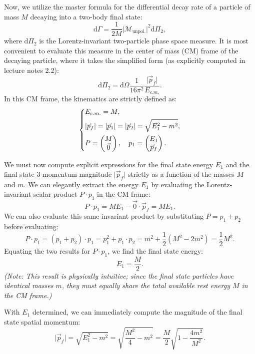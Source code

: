 Now, we utilize the master formula for the differential decay rate of a particle of mass \(M\) decaying into a two-body final state:
\[
    \mathrm{d} \Gamma = \frac{1}{2M} \vert \mathcal{M}_{\text{unpol.}} \vert^2 \mathrm{d} \Pi_2,
\]
where \( \mathrm{d} \Pi_2 \) is the Lorentz-invariant two-particle phase space measure. It is most convenient to evaluate this measure in the center of mass (CM) frame of the decaying particle, where it takes the simplified form (as explicitly computed in lecture notes 2.2):
\[
    \mathrm{d} \Pi_2 = \mathrm{d} \Omega \frac{1}{16 \pi^2} \frac{\vert \vec{p}_f \vert}{E_{c.m.}}.
\]
In this CM frame, the kinematics are strictly defined as:
\[
    \begin{dcases}
        E_{c.m.} = M,                                                                               \\
        \vert \vec{p}_f \vert = \vert \vec{p}_1 \vert = \vert \vec{p}_2 \vert = \sqrt{E_1^2 - m^2}, \\
        P = \begin{pmatrix} M \\ \vec{0} \end{pmatrix}, \quad p_1 = \begin{pmatrix} E_1 \\ \vec{p}_f \end{pmatrix}.
    \end{dcases}
\]

We must now compute explicit expressions for the final state energy \( E_1 \) and the final state 3-momentum magnitude \( \vert \vec{p}_f \vert \) strictly as a function of the masses \( M \) and \( m \). We can elegantly extract the energy \(E_1\) by evaluating the Lorentz-invariant scalar product \( P \cdot p_1 \) in the CM frame:
\[
    P \cdot p_1 = M E_1 - \vec{0} \cdot \vec{p}_f = M E_1.
\]
We can also evaluate this same invariant product by substituting \( P = p_1 + p_2 \) before evaluating:
\[
    P \cdot p_1 = (p_1 + p_2) \cdot p_1 = p_1^2 + p_1 \cdot p_2 = m^2 + \frac{1}{2}(M^2 - 2m^2) = \frac{1}{2}M^2.
\]
Equating the two results for \( P \cdot p_1 \), we find the final state energy:
\[
    E_1 = \frac{M}{2}.
\]
\textit{(Note: This result is physically intuitive; since the final state particles have identical masses $m$, they must equally share the total available rest energy $M$ in the CM frame.)}

With \( E_1 \) determined, we can immediately compute the magnitude of the final state spatial momentum:
\[
    \vert \vec{p}_f \vert = \sqrt{E_1^2 - m^2} = \sqrt{\frac{M^2}{4} - m^2} = \frac{M}{2} \sqrt{1 - \frac{4m^2}{M^2}}.
\]

